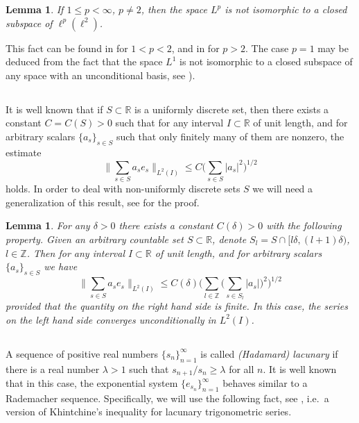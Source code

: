 \documentclass[reqno,a4paper,12pt]{amsart}
\numberwithin{equation}{section}
\numberwithin{figure}{section}
\newcommand\R{\mathbb{R}}
\newcommand\Z{\mathbb{Z}}
\newcommand\1{\mathds{1}}
\newcommand{\SSS}{S}
\renewcommand\le{\leqslant}
\renewcommand\ge{\geqslant}
\newcommand\sbt{\subset}
\theoremstyle{plain}
\newtheorem{lem}[thm]{Lemma}
\theoremstyle{definition}
\begin{document}
\begin{lem}\label{lem:noniso}
If $1 \le p < \infty$, $p\neq 2$, then the space $L^p$ is not isomorphic to a closed subspace of $\ell^p(\ell^2)$.
\end{lem}

This fact can be found in \cite[Example 8.2]{LP68} for $1<p < 2$, and in \cite[Theorem 6.1]{LP71} for $p > 2$. The case $p=1$ may be deduced from the fact that the space $L^1$ is not isomorphic to a closed subspace of any space with
an unconditional basis, see \cite[Section II.D, Theorem 10]{Woj91}).


\subsection{}
It is well known that if $\SSS \sbt \R$ is a uniformly discrete set, then there 
exists a constant $C = C(S) > 0$ such that for any interval $I\subset\R$ of unit length, and for arbitrary scalars $\{a_s\}_{s\in\SSS}$ such that only finitely many of them are nonzero, the estimate 
\begin{equation}
\Big\| \sum_{s\in \SSS} a_se_s \Big\|_{L^2(I)}\le C \Big( \sum_{s\in \SSS} |a_s|^2 \Big)^{1/2}
\end{equation}
holds. In order to deal with non-uniformly discrete sets $\SSS$ we will need a generalization of this result, see \cite[Section 5, p.14]{LT25b} for the proof. 

\begin{lem}
\label{lem:bess}
For any $\delta > 0$ there exists a constant $C(\delta) > 0$ with the following property. Given an arbitrary countable set $\SSS\subset\R$, denote $\SSS_l = \SSS\cap [l\delta, (l+1)\delta)$, $l\in\Z$. Then for any interval $I\subset\R$ of unit length, and for arbitrary scalars
$\{a_s\}_{s\in \SSS}$ we have
\begin{equation}
\label{eq:as.es}
\Big\| \sum_{s\in \SSS} a_se_s \Big\|_{L^2(I)}\le C(\delta)  \Big(\sum_{l\in\Z} \Big( \sum_{s\in \SSS_l}|a_s| \Big)^2\Big)^{1/2}
\end{equation}
provided that
the quantity on the right hand side is finite. In this case,
the series on the left hand side converges unconditionally in $L^2(I)$.
\end{lem}


\subsection{}
A sequence of positive real numbers $\{s_n\}_{n=1}^{\infty}$ is called \emph{(Hadamard) lacunary} if there is a real number $\lambda>1$ such that $s_{n+1}/s_n \ge \lambda$ for all $n$. It is well known that in this case, the exponential system $\{e_{s_n}\}_{n=1}^{\infty}$ behaves 
similar to a Rademacher sequence. Specifically, we will use the following fact,
see \cite[Chapter V, Theorem 8.20]{Zyg59}, i.e.\ a version of Khintchine's inequality for lacunary trigonometric series.
\end{document}

